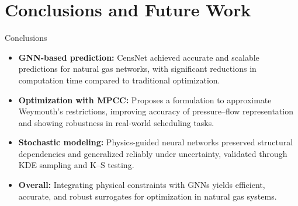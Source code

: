 \documentclass[hyperref={colorlinks,citecolor=blue,linkcolor=blue,urlcolor=blue}]{beamer}
\begin{document}
\section{Conclusions and Future Work}
\begin{frame}{Conclusions}
    \justifying
    \begin{itemize}
        \item \textbf{GNN-based prediction:} CensNet achieved accurate and scalable predictions for natural gas networks, with significant reductions in computation time compared to traditional optimization.
        \item \textbf{Optimization with MPCC:} Proposes a formulation to approximate Weymouth's restrictions, improving accuracy of pressure–flow representation and showing robustness in real-world scheduling tasks.
        \item \textbf{Stochastic modeling:} Physics-guided neural networks preserved structural dependencies and generalized reliably under uncertainty, validated through KDE sampling and K–S testing.
        \item \textbf{Overall:} Integrating physical constraints with GNNs yields efficient, accurate, and robust surrogates for optimization in natural gas systems.
    \end{itemize}
\end{frame}

\end{document}
